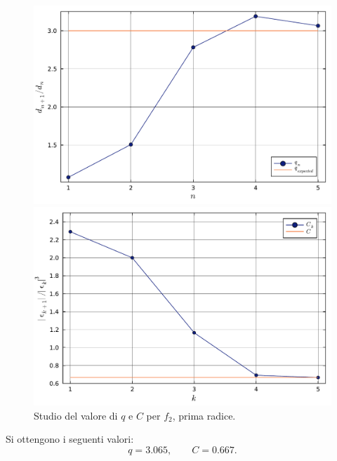 \documentclass[letterpaper, 12pt]{article}
\numberwithin{equation}{section}    %
\begin{document}
\begin{figure}[!ht]
    \centering
    \begin{minipage}[b]{0.47\textwidth}
        \includegraphics[width=\textwidth]{3322_q1.pdf}
    \end{minipage}
    \hspace{0.5cm}
    \begin{minipage}[b]{0.47\textwidth}
        \includegraphics[width=\textwidth]{3322_C1.pdf}
    \end{minipage}
    \caption{Studio del valore di $q$ e $C$ per $f_2$, prima radice.}
    \label{fig:es3_3_2_3}
\end{figure}

Si ottengono i seguenti valori:
\begin{equation*}
    q = 3.065,
    \qquad
    C = 0.667.
\end{equation*}
\end{document}
